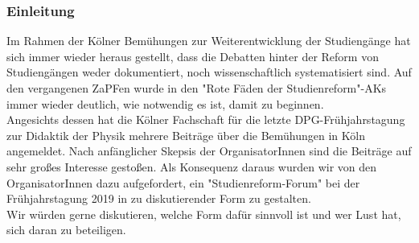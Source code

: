       \subsubsection*{Einleitung}
        Im Rahmen der Kölner Bemühungen zur Weiterentwicklung der Studiengänge hat sich immer wieder heraus gestellt, dass die Debatten hinter der Reform von Studiengängen weder dokumentiert, noch wissenschaftlich systematisiert sind.
        Auf den vergangenen ZaPFen wurde in den "Rote Fäden der Studienreform"-AKs immer wieder deutlich, wie notwendig es ist, damit zu beginnen. \\
        Angesichts dessen hat die Kölner Fachschaft für die letzte DPG-Frühjahrstagung zur Didaktik der Physik mehrere Beiträge über die Bemühungen in Köln angemeldet. Nach anfänglicher Skepsis der OrganisatorInnen sind die Beiträge auf sehr großes Interesse gestoßen.
        Als Konsequenz daraus wurden wir von den OrganisatorInnen dazu aufgefordert, ein "Studienreform-Forum" bei der Frühjahrstagung 2019 in zu diskutierender Form zu gestalten. \\
        Wir würden gerne diskutieren, welche Form dafür sinnvoll ist und wer Lust hat, sich daran zu beteiligen. \\

